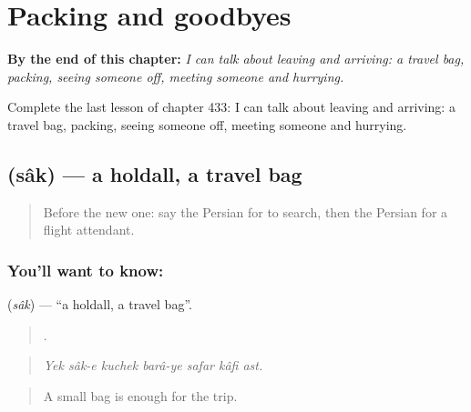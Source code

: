 
\chapter{Packing and goodbyes}
\label{ch:fa-packing-and-goodbyes}

\begin{chapteropening}
\textbf{By the end of this chapter:} \emph{I can talk about leaving and arriving: a travel bag, packing, seeing someone off, meeting someone and hurrying.}

Complete the last lesson of chapter 433: I can talk about leaving and arriving: a travel bag, packing, seeing someone off, meeting someone and hurrying.
\end{chapteropening}

\section[\texorpdfstring{\fa{ساک} (sâk)}{ساک (sâk)}]{ (sâk) — a holdall, a travel bag}

\label{lesson:FA-C433-sak}



\begin{quote}
Before the new one: say the Persian for to search, then the Persian for a flight attendant.
\end{quote}

\subsection*{You'll want to know: }
\textbf{} (\emph{sâk}) — \textquotedblleft{}a holdall, a travel bag\textquotedblright{}.

\begin{quote}
      .
\end{quote}

\begin{quote}
\emph{Yek sâk-e kuchek barâ-ye safar kâfi ast.}
\end{quote}

\begin{quote}
A small bag is enough for the trip.
\end{quote}

